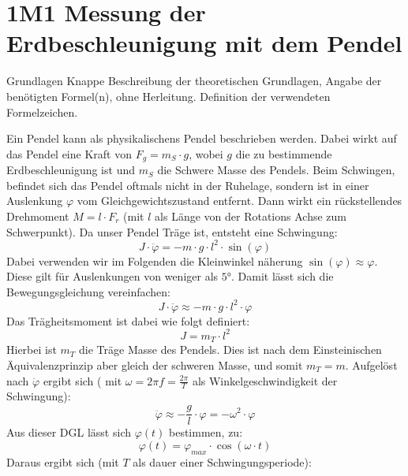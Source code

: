 \documentclass[twoside]{protokoll}
\begin{document}
 
\section{1M1 Messung der Erdbeschleunigung mit dem Pendel}
 
\begin{aufgabe}{Grundlagen}
  Knappe Beschreibung der theoretischen Grundlagen, Angabe der
  benötigten Formel(n), ohne Herleitung. Definition der verwendeten
  Formelzeichen.
\end{aufgabe}

Ein Pendel kann als physikalischens Pendel beschrieben werden.
Dabei wirkt auf das Pendel eine Kraft von $F_g = m_S \cdot g$, wobei $g$ die zu bestimmende Erdbeschleunigung ist und $m_S$ die Schwere Masse des Pendels.
Beim Schwingen, befindet sich das Pendel oftmals nicht in der Ruhelage, sondern ist in einer Auslenkung $\varphi$ vom Gleichgewichtszustand entfernt.
Dann wirkt ein rückstellendes Drehmoment $ M = l \cdot F_r$ (mit $l$ als Länge von der Rotations Achse zum Schwerpunkt).
Da unser Pendel Träge ist, entsteht eine Schwingung: 
\begin{equation}
    J \cdot \ddot{\varphi} = -m \cdot g \cdot l^2 \cdot \sin(\varphi)
\end{equation}
Dabei verwenden wir im Folgenden die Kleinwinkel näherung $\sin(\varphi) \approx \varphi$.
Diese gilt für Auslenkungen von weniger als $5$°. Damit lässt sich die Bewegungsgleichung vereinfachen:
\begin{equation}
    J \cdot \ddot{\varphi} \approx -m \cdot g \cdot l^2 \cdot \varphi
\end{equation}
Das Trägheitsmoment ist dabei wie folgt definiert:
\begin{equation}
    J =  m_T \cdot l^2
\end{equation}
Hierbei ist $m_T$ die Träge Masse des Pendels. Dies ist nach dem Einsteinischen Äquivalenzprinzip aber gleich der schweren Masse, und somit $m_T = m$.
Aufgelöst nach $\ddot{\varphi}$ ergibt sich ( mit $\omega = 2 \pi f = \frac{2 \pi}{T}$ als Winkelgeschwindigkeit der Schwingung):
\begin{equation}
    \ddot{\varphi} \approx -\frac{g}{l} \cdot \varphi = - \omega^2 \cdot \varphi
\end{equation}
Aus dieser DGL lässt sich $\varphi(t)$ bestimmen, zu:
\begin{equation}
    \varphi(t) = \varphi_{max} \cdot \cos(\omega \cdot t)
\end{equation}
Daraus ergibt sich (mit $T$ als dauer einer Schwingungsperiode):
\end{document}
